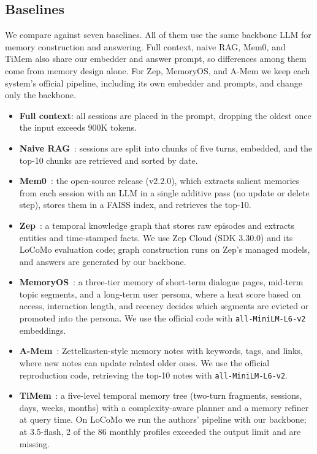 \documentclass[11pt]{article}
\begin{document}
\subsection{Baselines}

We compare against seven baselines. All of them use the same backbone LLM for memory construction and answering. Full context, naive RAG, Mem0, and TiMem also share our embedder and answer prompt, so differences among them come from memory design alone. For Zep, MemoryOS, and A-Mem we keep each system's official pipeline, including its own embedder and prompts, and change only the backbone.
\begin{itemize}
  \item \textbf{Full context}: all sessions are placed in the prompt, dropping the oldest once the input exceeds 900K tokens.
  \item \textbf{Naive RAG}~\citep{lewis2020rag}: sessions are split into chunks of five turns, embedded, and the top-10 chunks are retrieved and sorted by date.
  \item \textbf{Mem0}~\citep{chhikara2025mem0}: the open-source release (v2.2.0), which extracts salient memories from each session with an LLM in a single additive pass (no update or delete step), stores them in a FAISS index, and retrieves the top-10.
  \item \textbf{Zep}~\citep{rasmussen2025zep}: a temporal knowledge graph that stores raw episodes and extracts entities and time-stamped facts. We use Zep Cloud (SDK 3.30.0) and its LoCoMo evaluation code; graph construction runs on Zep's managed models, and answers are generated by our backbone.
  \item \textbf{MemoryOS}~\citep{kang2025memoryos}: a three-tier memory of short-term dialogue pages, mid-term topic segments, and a long-term user persona, where a heat score based on access, interaction length, and recency decides which segments are evicted or promoted into the persona. We use the official code with \texttt{all-MiniLM-L6-v2} embeddings.
  \item \textbf{A-Mem}~\citep{xu2025amem}: Zettelkasten-style memory notes with keywords, tags, and links, where new notes can update related older ones. We use the official reproduction code, retrieving the top-10 notes with \texttt{all-MiniLM-L6-v2}.
  \item \textbf{TiMem}~\citep{li2026timem}: a five-level temporal memory tree (two-turn fragments, sessions, days, weeks, months) with a complexity-aware planner and a memory refiner at query time. On LoCoMo we run the authors' pipeline with our backbone; at 3.5-flash, 2 of the 86 monthly profiles exceeded the output limit and are missing.
\end{itemize}
\end{document}
